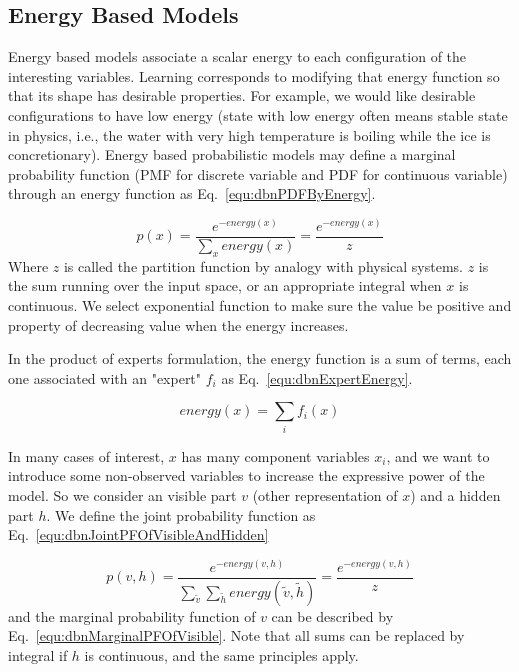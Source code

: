 \documentclass[runningheads,openany]{xhlPaper}
\begin{document}
\subsection{Energy Based Models}
Energy based models associate a scalar energy to each configuration of the interesting variables. Learning corresponds to modifying that energy function so that its shape has desirable properties. For example, we would like desirable configurations to have low energy (state with low energy often means stable state in physics, i.e., the water with very high temperature is boiling while the ice is concretionary). Energy based probabilistic models may define a marginal probability function (PMF for discrete variable and PDF for continuous variable) through an energy function as Eq.~\ref{equ:dbnPDFByEnergy}.

\begin{equation}
\label{equ:dbnPDFByEnergy}
p\left( x \right) = \frac{{{e^{ - energy\left( x \right)}}}}{{\sum\limits_x {energy\left( x \right)} }} = \frac{{{e^{ - energy\left( x \right)}}}}{z}
\end{equation}
Where $z$ is called the partition function by analogy with physical systems. $z$ is the sum running over the input space, or an appropriate integral when $x$ is continuous. We select exponential function to make sure the value be positive and property of decreasing value when the energy increases. 

In the product of experts formulation, the energy function is a sum of terms, each one associated with an "expert" $f_i$ as Eq.~\ref{equ:dbnExpertEnergy}.

\begin{equation}
\label{equ:dbnExpertEnergy}
energy\left( x \right) = \sum\limits_i {{f_i}\left( x \right)}
\end{equation}

In many cases of interest, $x$ has many component variables $x_i$, and we want to introduce some non-observed variables to increase the expressive power of the model. So we consider an visible part $v$ (other representation of $x$) and a hidden part $h$. We define the joint probability function as Eq.~\ref{equ:dbnJointPFOfVisibleAndHidden}

\begin{equation}
\label{equ:dbnJointPFOfVisibleAndHidden}
p\left( {v,h} \right) = \frac{{{e^{ - energy\left( {v,h} \right)}}}}{{\sum\limits_{\tilde v} {\sum\limits_{\tilde h} {energy\left( {\tilde v,\tilde h} \right)} } }} = \frac{{{e^{ - energy\left( {v,h} \right)}}}}{z}
\end{equation}
and the marginal probability function of $v$ can be described by Eq.~\ref{equ:dbnMarginalPFOfVisible}. Note that all sums can be replaced by integral if $h$ is continuous, and the same principles apply.
\end{document}
